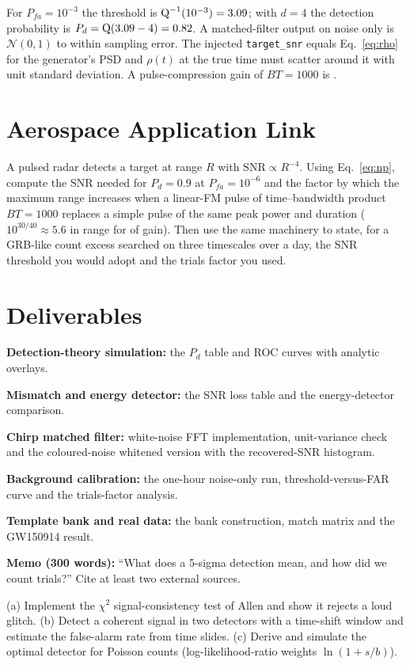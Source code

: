 \documentclass[11pt,a4paper]{article}
\begin{document}
\begin{checkpoint}
For $P_{fa}=10^{-3}$ the threshold is $\operatorname{Q}^{-1}(10^{-3})=3.09$; with $d=4$ the detection probability is $P_d=\operatorname{Q}(3.09-4)=0.82$. A matched-filter output on noise only is $\mathcal N(0,1)$ to within sampling error. The injected \texttt{target\_snr} equals Eq.~\eqref{eq:rho} for the generator's PSD and $\rho(t)$ at the true time must scatter around it with unit standard deviation. A pulse-compression gain of $BT=1000$ is .
\end{checkpoint}

\section*{Aerospace Application Link}
A pulsed radar detects a target at range $R$ with $\mathrm{SNR}\propto R^{-4}$. Using Eq.~\eqref{eq:np}, compute the SNR needed for $P_d=0.9$ at $P_{fa}=10^{-6}$ and the factor by which the maximum range increases when a linear-FM pulse of time--bandwidth product $BT=1000$ replaces a simple pulse of the same peak power and duration ($10^{30/40}\approx5.6$ in range for  of gain). Then use the same machinery to state, for a GRB-like count excess searched on three timescales over a day, the SNR threshold you would adopt and the trials factor you used.

\section*{Deliverables}
\begin{delivs}
  \item[D1] \textbf{Detection-theory simulation:} the $P_d$ table and ROC curves with analytic overlays.
  \item[D2] \textbf{Mismatch and energy detector:} the SNR loss table and the energy-detector comparison.
  \item[D3] \textbf{Chirp matched filter:} white-noise FFT implementation, unit-variance check and the coloured-noise whitened version with the recovered-SNR histogram.
  \item[D4] \textbf{Background calibration:} the one-hour noise-only run, threshold-versus-FAR curve and the trials-factor analysis.
  \item[D5] \textbf{Template bank and real data:} the bank construction, match matrix and the GW150914 result.
  \item[D6] \textbf{Memo (300 words):} ``What does a 5-sigma detection mean, and how did we count trials?'' Cite at least two external sources.
  \item[Bonus] (a) Implement the $\chi^2$ signal-consistency test of Allen and show it rejects a loud glitch. (b) Detect a coherent signal in two detectors with a time-shift window and estimate the false-alarm rate from time slides. (c) Derive and simulate the optimal detector for Poisson counts (log-likelihood-ratio weights $\ln(1+s/b)$).
\end{delivs}
\end{document}

